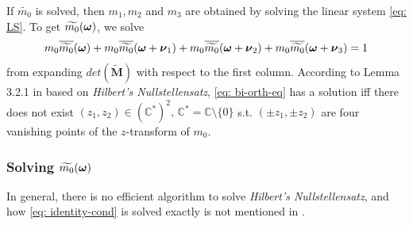 If $\widetilde{m_0}$ is solved, then $m_1,m_2$ and $m_3$ are obtained by solving the linear system \eqref{eq: LS}.
To get $\widetilde{m_{0}}(\boldsymbol{\omega})$, we solve 
\begin{align}\label{eq: bi-orth-eq}
m_0\overline{\widetilde{m_{0}}}(\boldsymbol{\omega}) + m_0\overline{\widetilde{m_{0}}}(\boldsymbol{\omega} + \boldsymbol{\nu}_{1}) + m_0\overline{\widetilde{m_{0}}}(\boldsymbol{\omega} + \boldsymbol{\nu}_{2}) + m_0\overline{\widetilde{m_{0}}}(\boldsymbol{\omega} + \boldsymbol{\nu}_{3}) = 1
\end{align}
from expanding $det(\widetilde{\mathbf{M}})$ with respect to the first column.
According to Lemma 3.2.1 in \cite{cohen1993compactly} based on {\it Hilbert's Nullstellensatz}, \eqref{eq: bi-orth-eq} has a solution iff there does not exist $(z_1,z_2)\in (\mathbb{C}^*)^2,\, \mathbb{C}^* = \mathbb{C}\setminus\{0\}$ s.t. $(\pm z_1,\pm z_2)$ are four 
vanishing points of the $z$-transform of $m_0$.

\subsubsection{Solving $\widetilde{m_{0}}(\boldsymbol{\omega})$}
In general, there is no efficient algorithm to solve {\it Hilbert's Nullstellensatz}, and how \eqref{eq: identity-cond} is solved exactly is not mentioned in \cite{cohen1993compactly}.


